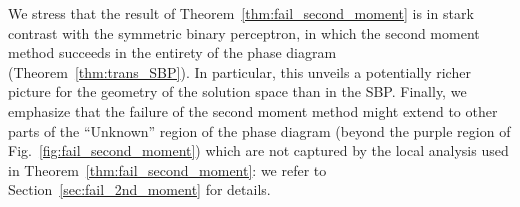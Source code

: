 \myskip
We stress that the result of Theorem~\ref{thm:fail_second_moment} is in stark contrast with the symmetric binary perceptron, in 
which the second moment method succeeds in the entirety of the phase diagram (Theorem~\ref{thm:trans_SBP}).
In particular, this unveils a potentially richer picture for the geometry of the solution space than in the SBP.
Finally, we emphasize that the failure of the second moment method might extend to other parts of the ``Unknown'' region of the phase diagram
(beyond the purple region of Fig.~\ref{fig:fail_second_moment}) 
which are not captured by the local analysis used in Theorem~\ref{thm:fail_second_moment}: we refer to Section~\ref{sec:fail_2nd_moment} for details.

